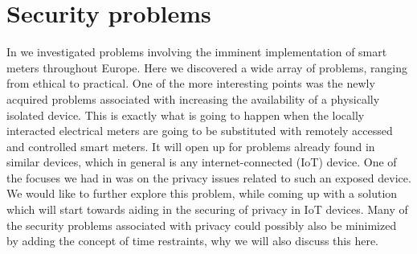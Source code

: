 
\section{Security problems}
In \cite{prespecialization} we investigated problems involving the imminent implementation of smart meters throughout Europe.
Here we discovered a wide array of problems, ranging from ethical to practical.
One of the more interesting points was the newly acquired problems associated with increasing the availability of a physically isolated device.
This is exactly what is going to happen when the locally interacted electrical meters are going to be substituted with remotely accessed and controlled smart meters.
It will open up for problems already found in similar devices, which in general is any internet-connected (IoT) device.
One of the focuses we had in \cite{prespecialization} was on the privacy issues related to such an exposed device.
We would like to further explore this problem, while coming up with a solution which will start towards aiding in the securing of privacy in IoT devices.
Many of the security problems associated with privacy could possibly also be minimized by adding the concept of time restraints, why we will also discuss this here.
